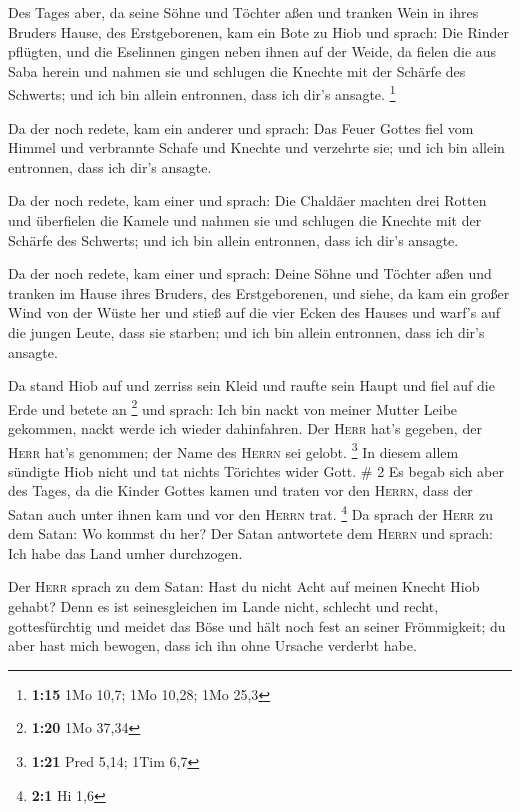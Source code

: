  Des Tages aber, da seine Söhne und Töchter aßen und
tranken Wein in ihres Bruders Hause, des Erstgeborenen, 
kam ein Bote zu Hiob und sprach: Die Rinder pflügten, und die Eselinnen
gingen neben ihnen auf der Weide,  da fielen die aus Saba
herein und nahmen sie und schlugen die Knechte mit der Schärfe des
Schwerts; und ich bin allein entronnen, dass ich dir's ansagte.
\footnote{\textbf{1:15} 1Mo 10,7; 1Mo 10,28; 1Mo 25,3}

 Da der noch redete, kam ein anderer und sprach: Das
Feuer Gottes fiel vom Himmel und verbrannte Schafe und Knechte und
verzehrte sie; und ich bin allein entronnen, dass ich dir's ansagte.

 Da der noch redete, kam einer und sprach: Die Chaldäer
machten drei Rotten und überfielen die Kamele und nahmen sie und
schlugen die Knechte mit der Schärfe des Schwerts; und ich bin allein
entronnen, dass ich dir's ansagte.

 Da der noch redete, kam einer und sprach: Deine Söhne
und Töchter aßen und tranken im Hause ihres Bruders, des Erstgeborenen,
 und siehe, da kam ein großer Wind von der Wüste her und
stieß auf die vier Ecken des Hauses und warf's auf die jungen Leute,
dass sie starben; und ich bin allein entronnen, dass ich dir's ansagte.

 Da stand Hiob auf und zerriss sein Kleid und raufte sein
Haupt und fiel auf die Erde und betete an \footnote{\textbf{1:20} 1Mo
  37,34}  und sprach: Ich bin nackt von meiner Mutter
Leibe gekommen, nackt werde ich wieder dahinfahren. Der \textsc{Herr}
hat's gegeben, der \textsc{Herr} hat's genommen; der Name des
\textsc{Herrn} sei gelobt. \footnote{\textbf{1:21} Pred 5,14; 1Tim 6,7}
 In diesem allem sündigte Hiob nicht und tat nichts
Törichtes wider Gott. \# 2  Es begab sich aber des Tages,
da die Kinder Gottes kamen und traten vor den \textsc{Herrn}, dass der
Satan auch unter ihnen kam und vor den \textsc{Herrn} trat. \footnote{\textbf{2:1}
  Hi 1,6}  Da sprach der \textsc{Herr} zu dem Satan: Wo
kommst du her? Der Satan antwortete dem \textsc{Herrn} und sprach: Ich
habe das Land umher durchzogen.

 Der \textsc{Herr} sprach zu dem Satan: Hast du nicht Acht
auf meinen Knecht Hiob gehabt? Denn es ist seinesgleichen im Lande
nicht, schlecht und recht, gottesfürchtig und meidet das Böse und hält
noch fest an seiner Frömmigkeit; du aber hast mich bewogen, dass ich ihn
ohne Ursache verderbt habe.

